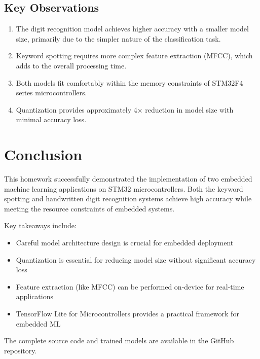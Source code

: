 \documentclass[12pt,a4paper]{article}
\begin{document}
\subsection{Key Observations}

\begin{enumerate}
    \item The digit recognition model achieves higher accuracy with a smaller model size, primarily due to the simpler nature of the classification task.
    
    \item Keyword spotting requires more complex feature extraction (MFCC), which adds to the overall processing time.
    
    \item Both models fit comfortably within the memory constraints of STM32F4 series microcontrollers.
    
    \item Quantization provides approximately 4× reduction in model size with minimal accuracy loss.
\end{enumerate}

\section{Conclusion}

This homework successfully demonstrated the implementation of two embedded machine learning applications on STM32 microcontrollers. Both the keyword spotting and handwritten digit recognition systems achieve high accuracy while meeting the resource constraints of embedded systems.

Key takeaways include:
\begin{itemize}
    \item Careful model architecture design is crucial for embedded deployment
    \item Quantization is essential for reducing model size without significant accuracy loss
    \item Feature extraction (like MFCC) can be performed on-device for real-time applications
    \item TensorFlow Lite for Microcontrollers provides a practical framework for embedded ML
\end{itemize}

The complete source code and trained models are available in the GitHub repository.
\end{document}

